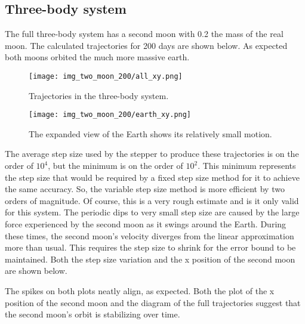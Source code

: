 \documentclass[12pt]{article}
\begin{document}
\subsection{Three-body system}
The full three-body system has a second moon with 0.2 the mass of the real moon. The calculated trajectories for 200 days are shown below. As expected both moons orbited the much more massive earth.
\begin{figure}[H]
\centering
\texttt{[image: img\_two\_moon\_200/all\_xy.png]}
\caption{Trajectories in the three-body system.}
\end{figure}
\begin{figure}[H]
\centering
\texttt{[image: img\_two\_moon\_200/earth\_xy.png]}
\caption{The expanded view of the Earth shows its relatively small motion.}
\end{figure}
The average step size used by the stepper to produce these trajectories is on the order of $10^4$, but the minimum is on the order of $10^2$. This minimum represents the step size that would be required by a fixed step size method for it to achieve the same accuracy. So, the variable step size method is more efficient by two orders of magnitude. Of course, this is a very rough estimate and is it only valid for this system. The periodic dips to very small step size are caused by the large force experienced by the second moon as it swings around the Earth. During these times, the second moon's velocity diverges from the linear approximation more than usual. This requires the step size to shrink for the error bound to be maintained. Both the step size variation and the x position of the second moon are shown below.
\begin{figure}[H]
 \qquad
{} \qquad
\end{figure}
The spikes on both plots neatly align, as expected. Both the plot of the x position of the second moon and the diagram of the full trajectories suggest that the second moon's orbit is stabilizing over time.
\clearpage
\end{document}

